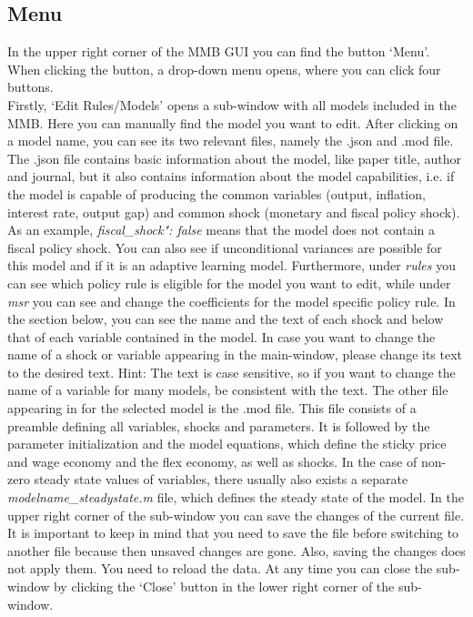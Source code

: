 \subsection*{Menu}
In the upper right corner of the MMB GUI you can find the button `Menu'. When clicking the button, a drop-down menu opens, where you can click four buttons.\\
Firstly, `Edit Rules/Models' opens a sub-window with all models included in the MMB. Here you can manually find the model you want to edit. After clicking on a model name, you can see its two relevant files, namely the .json and .mod file. The .json file contains basic information about the model, like paper title, author and journal, but it also contains information about the model capabilities, i.e. if the model is capable of producing the common variables (output, inflation, interest rate, output gap) and common shock (monetary and fiscal policy shock). As an example, \textit{fiscal\_shock": false} means that the model does not contain a fiscal policy shock. You can also see if unconditional variances are possible for this model and if it is an adaptive learning model. Furthermore, under \textit{rules} you can see which policy rule is eligible for the model you want to edit, while under \textit{msr} you can see and change the coefficients for the model specific policy rule. In the section below, you can see the name and the text of each shock and below that of each variable contained in the model. In case you want to change the name of a shock or variable appearing in the main-window, please change its text to the desired text. Hint: The text is case sensitive, so if you want to change the name of a variable for many models, be consistent with the text. The other file appearing in for the selected model is the .mod file. This file consists of a preamble defining all variables, shocks and parameters. It is followed by the parameter initialization and the model equations, which define the sticky price and wage economy and the flex economy, as well as shocks. In the case of non-zero steady state values of variables, there usually also exists a separate \textit{modelname\_steadystate.m} file, which defines the steady state of the model. In the upper right corner of the sub-window you can save the changes of the current file. It is important to keep in mind that you need to save the file before switching to another file because then unsaved changes are gone. Also, saving the changes does not apply them. You need to reload the data. At any time you can close the sub-window by clicking the `Close' button in the lower right corner of the sub-window. 

